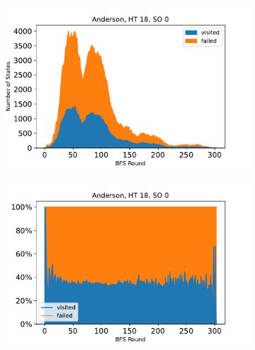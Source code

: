 \documentclass[
fancyheadings, %
%
%
]{stsreprt}
\begin{document}
\begin{figure}[p]
    \begin{subfigure}[b]{.5\textwidth}
        \centering
        \includegraphics[width=\textwidth]{../evaluation/output-assets/EXP-11-bfs-frontiers-3.pdf}
        \label{fig:evaluation:EXP-11:3}
    \end{subfigure}
    \begin{subfigure}[b]{.5\textwidth}
        \centering
        \includegraphics[width=\textwidth]{../evaluation/output-assets/EXP-11-bfs-frontiers-7.pdf}
        \label{fig:evaluation:EXP-11:7}
    \end{subfigure}


\end{figure}
\end{document}
